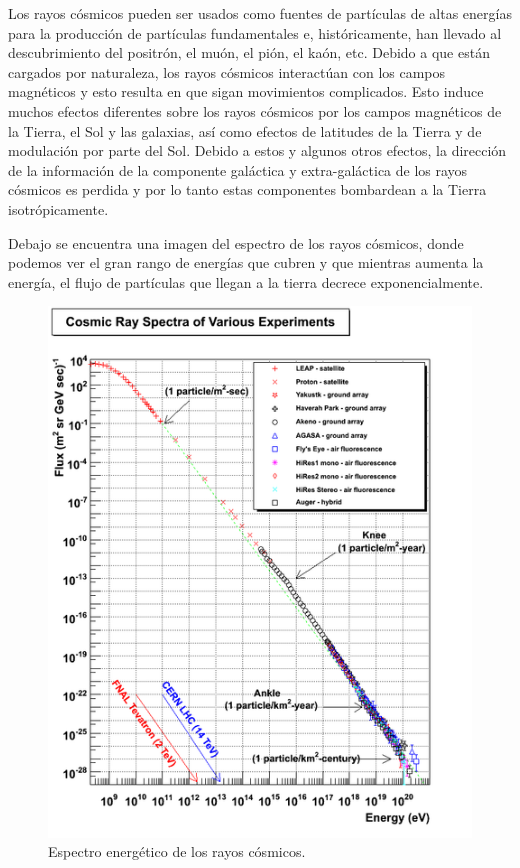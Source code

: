 \documentclass[a4paper,10pt]{article}
\numberwithin{equation}{section}
\begin{document}
Los rayos cósmicos pueden ser usados como fuentes de partículas de altas energías 
para la producción de partículas fundamentales e, históricamente, han llevado 
al descubrimiento del positrón, el muón, el pión, el kaón, etc. Debido a que 
están cargados por naturaleza, los rayos cósmicos interactúan con los 
campos magnéticos y esto resulta en que sigan movimientos complicados. Esto 
induce muchos efectos diferentes sobre los rayos cósmicos por los campos magnéticos 
de la Tierra, el Sol y las galaxias, así como efectos de latitudes de la Tierra 
y de modulación por parte del Sol. Debido a estos y algunos otros efectos, 
la dirección de la información de la componente galáctica y extra-galáctica 
de los rayos cósmicos es perdida y por lo tanto estas componentes bombardean 
a la Tierra isotrópicamente. 

\vspace{.3cm}

Debajo se encuentra una imagen del espectro de los rayos cósmicos, donde podemos ver 
el gran rango de energías que cubren y que mientras aumenta la energía, el flujo 
de partículas que llegan a la tierra decrece exponencialmente.

\begin{figure}[H]
 \center 
 \includegraphics[scale=0.7]{fig1}
 \caption{Espectro energético de los rayos cósmicos.}
 \label{fig:fig1}
\end{figure}
\end{document}
